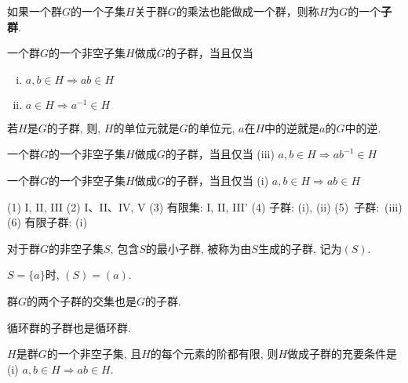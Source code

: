 \begin{Definition}[子群]
如果一个群$G$的一个子集$H$关于群$G$的乘法也能做成一个群，则称$H$为$G$的一个\textbf{子群}.
\end{Definition}

\begin{Theorem}
一个群$G$的一个非空子集$H$做成$G$的子群，当且仅当
\begin{enumerate}[(i)]
\item $a, b \in H \Rightarrow ab \in H$
\item $a \in H \Rightarrow a^{-1} \in H$
\end{enumerate}
\end{Theorem}

\begin{Corollary}
若$H$是$G$的子群, 则, $H$的单位元就是$G$的单位元, $a$在$H$中的逆就是$a$的$G$中的逆.
\end{Corollary}

\begin{Theorem}
一个群$G$的一个非空子集$H$做成$G$的子群，当且仅当 (iii) $a, b \in H \Rightarrow ab^{-1} \in H$
\end{Theorem}

\begin{Theorem}
一个群$G$的一个非空\;\;子集$H$做成$G$的子群，当且仅当 (i) $a, b \in H \Rightarrow ab \in H$
\end{Theorem}

\begin{Note}[验证非空集合是群的方法]
(1) I, II, III (2) I、II、IV, V (3) 有限集: I, II, III'
(4) 子群: (i), (ii) \mbox{(5) 子群: (iii)} (6) 有限子群: (i)
\end{Note}

\begin{Definition}[生成子群]
对于群$G$的非空子集$S$, 包含$S$的最小子群, 被称为由$S$生成的子群, 记为$(S)$.
\end{Definition}

\begin{Theorem}
$S = \{a\}$时, $(S) = (a)$.
\end{Theorem}

\begin{Proposition}
群$G$的两个子群的交集也是$G$的子群.
\end{Proposition}

\begin{Proposition}
循环群的子群也是循环群.
\end{Proposition}

\begin{Proposition}
$H$是群$G$的一个非空子集, 且$H$的每个元素的阶都有限,
则$H$做成子群的充要条件是 (i) $a, b \in H \Rightarrow ab \in H$.
\end{Proposition}

